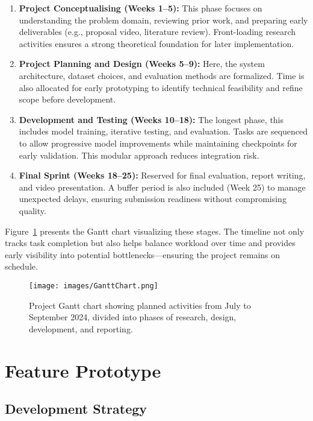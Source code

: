 \documentclass[12pt]{article}
\begin{document}
\begin{enumerate}
    \item \textbf{Project Conceptualising (Weeks 1–5):} This phase focuses on understanding the problem domain, reviewing prior work, and preparing early deliverables (e.g., proposal video, literature review). Front-loading research activities ensures a strong theoretical foundation for later implementation.

    \item \textbf{Project Planning and Design (Weeks 5–9):} Here, the system architecture, dataset choices, and evaluation methods are formalized. Time is also allocated for early prototyping to identify technical feasibility and refine scope before development.

    \item \textbf{Development and Testing (Weeks 10–18):} The longest phase, this includes model training, iterative testing, and evaluation. Tasks are sequenced to allow progressive model improvements while maintaining checkpoints for early validation. This modular approach reduces integration risk.

    \item \textbf{Final Sprint (Weeks 18–25):} Reserved for final evaluation, report writing, and video presentation. A buffer period is also included (Week 25) to manage unexpected delays, ensuring submission readiness without compromising quality.
\end{enumerate}

Figure~\ref{fig:gantt} presents the Gantt chart visualizing these stages. The timeline not only tracks task completion but also helps balance workload over time and provides early visibility into potential bottlenecks—ensuring the project remains on schedule.

\begin{figure}[H]
    \centering
    \texttt{[image: images/GanttChart.png]}
    \caption{Project Gantt chart showing planned activities from July to September 2024, divided into phases of research, design, development, and reporting.}
    \label{fig:gantt}
\end{figure}

\newpage
\section{Feature Prototype}
\subsection{Development Strategy}
\end{document}
